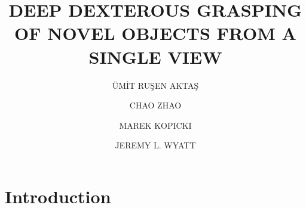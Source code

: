 \documentclass{ws-ijhr}
\begin{document}

%
\catchline{}{}{}{}{}
%

\title{DEEP DEXTEROUS GRASPING OF NOVEL OBJECTS FROM A SINGLE VIEW}

\author{\"{U}M\.{I}T RU\c{S}EN AKTA\c{S}}

\address{Intelligent Robotics Lab, University of Birmingham,\\
Birmingham, West Midlands, B15 2TT, UK\\
rusenaktas@gmail.com}

\author{CHAO ZHAO}

\address{Robotics Institute, Department of Electronic\\
and Computer Engineering, HKUST, Hongkong, China\\
czhaobb@connect.ust.hk}

\author{MAREK KOPICKI}

\address{Intelligent Robotics Lab, University of Birmingham,\\
Birmingham, West Midlands, B15 2TT, UK\\
marek.kopicki@gmail.com}

\author{JEREMY L. WYATT}

\address{Intelligent Robotics Lab, University of Birmingham,\\
Birmingham, West Midlands, B15 2TT, UK\\
jeremy.l.wyatt@gmail.com}

\maketitle


\begin{abstract}

\end{abstract}


\section{Introduction}
\end{document}
